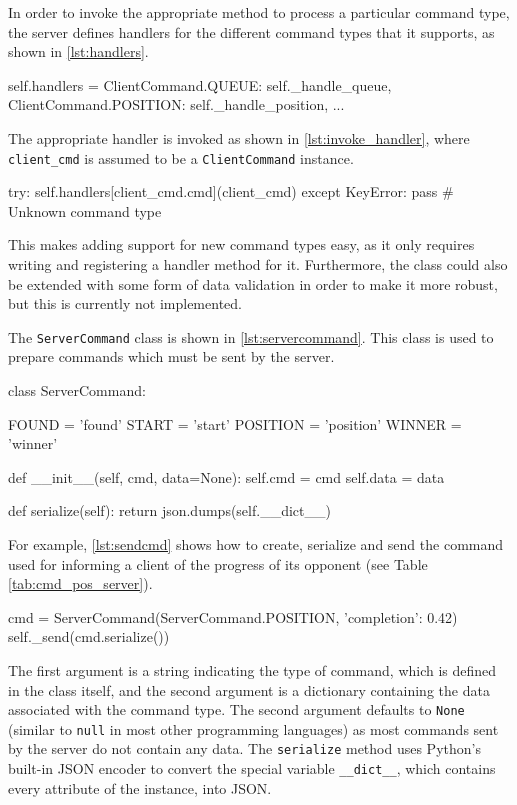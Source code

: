In order to invoke the appropriate method to process a particular command type, the server defines handlers for the different command types that it supports, as shown in \autoref{lst:handlers}.

\begin{code}[language={Python}, caption={Handlers for Different Command Types}, label={lst:handlers}]
self.handlers = {
		ClientCommand.QUEUE: self._handle_queue,
		ClientCommand.POSITION: self._handle_position,
		...
	}
\end{code}

The appropriate handler is invoked as shown in \autoref{lst:invoke_handler}, where \texttt{client\_cmd} is assumed to be a \texttt{Client\-Command} instance.

\begin{code}[language={Python}, caption={Invoking a Handler Method}, label={lst:invoke_handler}]
try:
	self.handlers[client_cmd.cmd](client_cmd)
except KeyError:
	pass # Unknown command type
\end{code}

This makes adding support for new command types easy, as it only requires writing and registering a handler method for it.
Furthermore, the class could also be extended with some form of data validation in order to make it more robust, but this is currently not implemented.

The \texttt{Server\-Command} class is shown in \autoref{lst:servercommand}.
This class is used to prepare commands which must be sent by the server.

\begin{code}[language={Python}, caption={\texttt{ServerCommand} Class}, label={lst:servercommand}]
class ServerCommand:

	FOUND = 'found'
	START = 'start'
	POSITION = 'position'
	WINNER = 'winner'

	def __init__(self, cmd, data=None):
		self.cmd = cmd
		self.data = data

	def serialize(self):
		return json.dumps(self.__dict__)
\end{code}

For example, \autoref{lst:sendcmd} shows how to create, serialize and send the command used for informing a client of the progress of its opponent (see Table \vref{tab:cmd_pos_server}).

\begin{code}[language={Python}, caption={Creating and Sending a Command}, label={lst:sendcmd}]
cmd = ServerCommand(ServerCommand.POSITION, {'completion': 0.42})
self._send(cmd.serialize())
\end{code}

The first argument is a string indicating the type of command, which is defined in the class itself, and the second argument is a dictionary containing the data associated with the command type.
The second argument defaults to \texttt{None} (similar to \texttt{null} in most other programming languages) as most commands sent by the server do not contain any data.
The \texttt{serialize} method uses Python's built-in JSON encoder to convert the special variable \texttt{\_\_dict\_\_}, which contains every attribute of the instance, into JSON.
